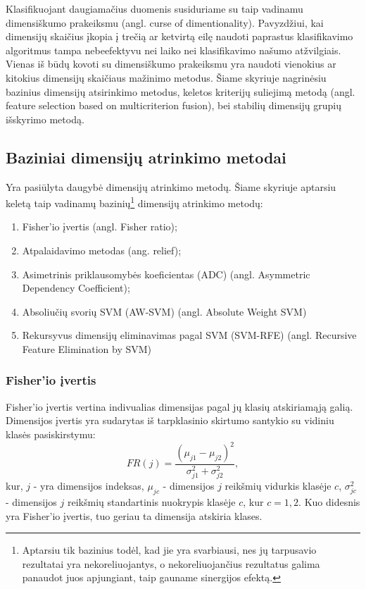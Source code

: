 Klasifikuojant daugiamačius duomenis susiduriame su taip vadinamu dimensiškumo
prakeiksmu (angl. curse of dimentionality). Pavyzdžiui, kai dimensijų skaičius įkopia į
trečią ar ketvirtą eilę naudoti paprastus klasifikavimo algoritmus tampa
nebeefektyvu nei laiko nei klasifikavimo našumo atžvilgiais. Vienas iš būdų
kovoti su dimensiškumo prakeiksmu
yra naudoti vienokius ar kitokius dimensijų skaičiaus mažinimo metodus. Šiame
skyriuje nagrinėsiu bazinius dimensijų atsirinkimo metodus, keletos 
kriterijų suliejimą metodą (angl.
feature selection based on multicriterion fusion)\cite{5611484}, bei
stabilių dimensijų grupių išskyrimo metodą\cite{Loscalzo:2009:CGS:1557019.1557084}.

\subsection{Baziniai dimensijų atrinkimo metodai}

Yra pasiūlyta daugybė dimensijų atrinkimo metodų. Šiame skyriuje aptarsiu
keletą taip vadinamų bazinių\footnote{Aptarsiu tik bazinius todėl, kad jie yra 
svarbiausi, nes jų tarpusavio rezultatai yra nekoreliuojantys, o nekoreliuojančius
rezultatus galima panaudot juos apjungiant, taip gauname sinergijos efektą.}
dimensijų atrinkimo metodų: 
\begin{enumerate}
 \item Fisher'io įvertis (angl. Fisher ratio)\cite{Pavlidis:2001:GFC:369133.369228};
 \item Atpalaidavimo metodas\cite{DBLP:journals/ml/Robnik-SikonjaK03} (ang. relief);
 \item Asimetrinis priklausomybės koeficientas\cite{Shannon:2001:MTC:584091.584093} (ADC) (angl.
 Asymmetric Dependency Coefficient);
 \item Absoliučių svorių SVM\cite{vapnik2000nature} (AW-SVM) (angl. Absolute Weight SVM)
 \item Rekursyvus dimensijų eliminavimas pagal SVM\cite{Guyon:2002:GSC:599613.599671} (SVM-RFE) (angl. Recursive
 Feature Elimination by SVM)
\end{enumerate}

\subsubsection{Fisher'io įvertis}

Fisher'io įvertis vertina indivualias dimensijas pagal jų klasių atskiriamąją 
galią. Dimensijos įvertis yra sudarytas iš tarpklasinio skirtumo santykio su 
vidiniu klasės pasiskirstymu:
\begin{equation}
 FR(j) = \frac{(\mu_{j1} - \mu_{j2})^2}{\sigma_{j1}^2 + \sigma_{j2}^2},
\end{equation}
kur, $j$ - yra dimensijos indeksas, $\mu_{jc}$ - dimensijos $j$ reikšmių vidurkis
klasėje $c$, $\sigma_{jc}^2$ - dimensijos $j$ reikšmių standartinis nuokrypis
klasėje $c$, kur $c={1,2}$. Kuo didesnis yra Fisher'io įvertis, tuo geriau ta
dimensija atskiria klases.

